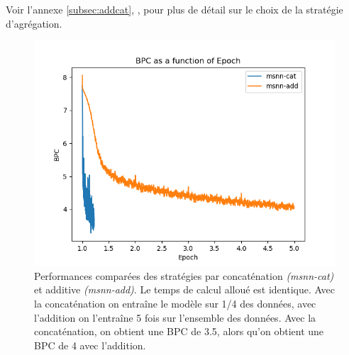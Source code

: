Voir l'annexe \ref{subsec:addcat}, , pour plus de détail sur le choix de la stratégie d'agrégation. 

\begin{figure}[H]
	\centering
	\includegraphics[width=\textwidth]{parts/appendix/reports-gmsnn/docs_esteban-latex/test_reports/comparative-bpc-msnn-det-msnn-cat.png}
	\caption[Performances comparées des stratégies additive et par concaténation]{Performances comparées des stratégies par concaténation \textit{(msnn-cat)} et additive \textit{(msnn-add)}. Le temps de calcul alloué est identique. Avec la concaténation on entraîne le modèle sur 1/4 des données, avec l'addition on l'entraîne 5 fois sur l'ensemble des données. Avec la concaténation, on obtient une BPC de 3.5, alors qu'on obtient une BPC de 4 avec l'addition.}\label{fig:addcat}
\end{figure}
